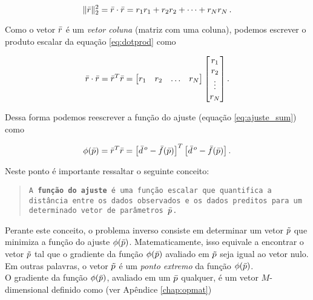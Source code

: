 \begin{equation}
\lVert\bar{r}\rVert_2^2 = \bar{r} \cdot \bar{r} =
    r_1r_1 + r_2r_2 + \dotsb + r_Nr_N \thinspace .
\label{eq:dotprod}
\end{equation}

\noindent Como o vetor $\bar{r}$ é um {\it vetor coluna} (matriz com uma
coluna), podemos escrever o produto escalar da equação \ref{eq:dotprod} como

\begin{equation}
\bar{r} \cdot \bar{r} = \bar{r}^T \bar{r} =
    \begin{bmatrix}
        r_1 & r_2 & \ldots & r_N
    \end{bmatrix}
    \begin{bmatrix}
        r_1 \\ r_2 \\ \vdots \\ r_N
    \end{bmatrix} .
\label{eq:vectdotprod}
\end{equation}

\noindent Dessa forma podemos reescrever a função do ajuste (equação
\ref{eq:ajuste_sum}) como

\begin{equation}
\phi(\bar{p}) = \bar{r}^T \bar{r} =
    \left[\bar{d}^{\thinspace o} - \bar{f}(\bar{p})\right]^T
    \left[\bar{d}^{\thinspace o} - \bar{f}(\bar{p})\right] .
\label{eq:ajuste}
\end{equation}

\indent Neste ponto é importante ressaltar o seguinte conceito:

\begin{quote}
{\tt A {\bf função do ajuste} é uma função escalar que
quantifica a dis\-tân\-cia entre os dados observados e os dados preditos para um
de\-ter\-mi\-na\-do vetor de parâmetros $\bar{p}$.}
\end{quote}

\indent Perante este conceito, o problema inverso consiste em determinar um
vetor $\tilde{p}$ que minimiza a função do ajuste $\phi(\bar{p})$. 
Matematicamente, isso equivale a encontrar o vetor $\tilde{p}$ tal que o gradiente
da função $\phi(\bar{p})$ avaliado em $\tilde{p}$ seja igual ao vetor nulo.
Em outras palavras, o vetor $\tilde{p}$ é um {\it ponto extremo} da função
$\phi(\bar{p})$.
\\
\indent O gradiente da função $\phi(\bar{p})$, avaliado em um $\bar{p}$ qualquer,
é um vetor $M$-dimensional definido como (ver Apêndice \ref{chap:opmat})

